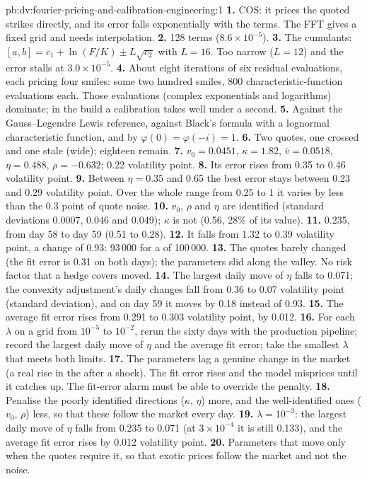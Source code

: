 \begin{solution}{pb:dv:fourier-pricing-and-calibration-engineering:1}
\textbf{1.} COS: it prices the quoted strikes directly, and its error falls exponentially with the terms. The FFT gives a fixed grid and needs
interpolation.
\textbf{2.} 128 terms ($8.6\times10^{-5}$).
\textbf{3.} The cumulants: $[a,b]=c_1+\ln(F/K)\pm L\sqrt{c_2}$ with $L=16$. Too narrow ($L=12$) and the error stalls at $3.0\times10^{-5}$.
\textbf{4.} About eight iterations of six residual evaluations, each pricing four smiles: some two hundred smiles, 800 characteristic-function
evaluations each. Those evaluations (complex exponentials and logarithms) dominate; in the build a calibration takes well under a second.
\textbf{5.} Against the Gauss--Legendre Lewis reference, against Black's formula with a lognormal characteristic function, and by $\varphi(0)=
\varphi(-i)=1$.
\textbf{6.} Two quotes, one crossed and one stale (wide); eighteen remain.
\textbf{7.} $v_0=0.0451$, $\kappa=1.82$, $\bar v=0.0518$, $\eta=0.488$, $\rho=-0.632$; 0.22 volatility point.
\textbf{8.} Its error rises from 0.35 to 0.46 volatility point.
\textbf{9.} Between $\eta=0.35$ and 0.65 the best error stays between 0.23 and 0.29 volatility point. Over the whole range from 0.25 to 1 it varies by
less than the 0.3 point of quote noise.
\textbf{10.} $v_0$, $\rho$ and $\eta$ are identified (standard deviations 0.0007, 0.046 and 0.049); $\kappa$ is not (0.56, 28\% of its value).
\textbf{11.} 0.235, from day 58 to day 59 (0.51 to 0.28).
\textbf{12.} It falls from 1.32 to 0.39 volatility point, a change of 0.93: 93\,000 for a  of 100\,000.
\textbf{13.} The quotes barely changed (the fit error is 0.31 on both days); the parameters slid along the valley. No risk factor that a hedge covers
moved.
\textbf{14.} The largest daily move of $\eta$ falls to 0.071; the convexity adjustment's daily changes fall from 0.36 to 0.07 volatility point
(standard deviation), and on day 59 it moves by 0.18 instead of 0.93.
\textbf{15.} The average fit error rises from 0.291 to 0.303 volatility point, by 0.012.
\textbf{16.} For each $\lambda$ on a grid from $10^{-5}$ to $10^{-2}$, rerun the sixty days with the production pipeline; record the largest daily move of
$\eta$ and the average fit error; take the smallest $\lambda$ that meets both limits.
\textbf{17.} The parameters lag a genuine change in the market (a real rise in the  after a shock). The fit error rises and the
model misprices until it catches up. The fit-error alarm must be able to override the penalty.
\textbf{18.} Penalise the poorly identified directions ($\kappa$, $\eta$) more, and the well-identified ones ($v_0$, $\rho$) less, so that these follow
the market every day.
\textbf{19.} $\lambda=10^{-3}$: the largest daily move of $\eta$ falls from 0.235 to 0.071 (at $3\times10^{-4}$ it is still 0.133), and the average fit
error rises by 0.012 volatility point.
\textbf{20.} Parameters that move only when the quotes require it, so that exotic prices follow the market and not the noise.
\end{solution}

